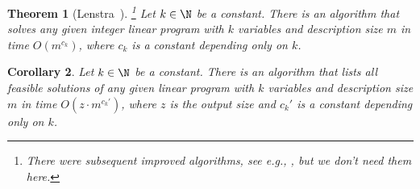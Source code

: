 \documentclass[a4paper, 11pt]{article}
\newtheorem{theorem}{Theorem}[section]
\newtheorem{corollary}[theorem]{Corollary}
\begin{document}
\begin{theorem}[Lenstra~\cite{Lenstra83}]\!\!\footnote{There were subsequent improved algorithms, see e.g., \cite{ReisR23}, but we don't need them here.}
    \label{thm:ILP}
    Let $k \in \N$ be a constant. There is an algorithm that solves any given integer linear program with $k$ variables and description size $m$ in time $O(m^{c_k})$, where $c_k$ is a constant depending only on $k$.
\end{theorem}

\begin{corollary}
    \label{cor:ILP}
    Let $k \in \N$ be a constant. There is an algorithm that lists all feasible solutions of any given linear program with $k$ variables and description size $m$ in time $O(z \cdot m^{c_k'})$, where $z$ is the output size and $c_k'$ is a constant depending only on $k$.
\end{corollary}
\end{document}
